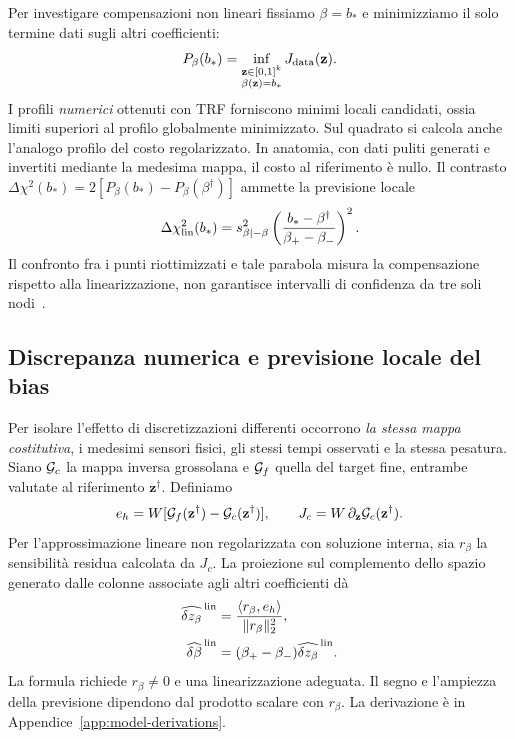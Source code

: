 Per investigare compensazioni non lineari fissiamo $\beta=b_*$ e minimizziamo il solo termine dati sugli altri coefficienti:
\[
 P_\beta(b_*)=\inf_{\substack{\mathbf z\in[0,1]^k\\\beta(\mathbf z)=b_*}} J_{\rm data}(\mathbf z).
\]
I profili \emph{numerici} ottenuti con TRF forniscono minimi locali candidati, ossia limiti superiori al profilo globalmente minimizzato. Sul quadrato si calcola anche l'analogo profilo del costo regolarizzato. In anatomia, con dati puliti generati e invertiti mediante la medesima mappa, il costo al riferimento è nullo. Il contrasto $\Delta\chi^2(b_*)=2[P_\beta(b_*)-P_\beta(\beta^\dagger)]$ ammette la previsione locale
\[
 \Delta\chi^2_{\rm lin}(b_*)
 =s_{\beta\mid-\beta}^2
 \left(\frac{b_*-\beta^\dagger}{\beta_+-\beta_-}\right)^2 .
\]
Il confronto fra i punti riottimizzati e tale parabola misura la compensazione rispetto alla linearizzazione, non garantisce intervalli di confidenza da tre soli nodi~\citep{raue2009structural,brun2001practical}.

\subsection{Discrepanza numerica e previsione locale del bias}

Per isolare l'effetto di discretizzazioni differenti occorrono \emph{la stessa mappa costitutiva}, i medesimi sensori fisici, gli stessi tempi osservati e la stessa pesatura. Siano $\mathcal{G}_c$ la mappa inversa grossolana e $\mathcal{G}_f$ quella del target fine, entrambe valutate al riferimento $\mathbf z^\dagger$. Definiamo
\[
 e_h=W[\mathcal{G}_f(\mathbf z^\dagger)-\mathcal{G}_c(\mathbf z^\dagger)],
 \qquad J_c=W\,\partial_{\mathbf z}\mathcal{G}_c(\mathbf z^\dagger).
\]
Per l'approssimazione lineare non regolarizzata con soluzione interna, sia $r_\beta$ la sensibilità residua calcolata da $J_c$. La proiezione sul complemento dello spazio generato dalle colonne associate agli altri coefficienti dà
\begin{equation}
\begin{aligned}
 \widehat{\delta z_\beta}^{\,\rm lin}
 &=\frac{\langle r_\beta,e_h\rangle}{\|r_\beta\|_2^2},\\
 \widehat{\delta\beta}^{\,\rm lin}
 &=(\beta_+-\beta_-)\widehat{\delta z_\beta}^{\,\rm lin} .
\end{aligned}
\label{eq:beta-discretization-bias}
\end{equation}
La formula richiede $r_\beta\ne0$ e una linearizzazione adeguata. Il segno e l'ampiezza della previsione dipendono dal prodotto scalare con $r_\beta$. La derivazione è in Appendice~\ref{app:model-derivations}.
